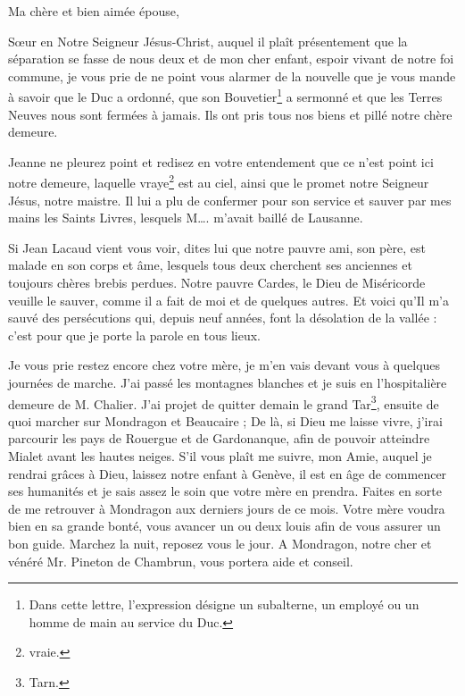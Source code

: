 {
\Junicode

\vspace{-5mm}

Ma chère et bien aimée épouse,

Sœur en Notre Seigneur Jésus-Christ, auquel il plaît présentement que la séparation se fasse de nous deux et de mon cher enfant, espoir vivant de notre foi commune, je vous prie de ne point vous alarmer de la nouvelle que je vous mande à savoir que le Duc a ordonné, que son Bouvetier\footnote{Dans cette lettre, l'expression désigne un subalterne, un employé ou un homme de main au service du Duc.} a sermonné et que les Terres Neuves nous sont fermées à jamais. Ils ont pris tous nos biens et pillé notre chère demeure.

Jeanne ne pleurez point et redisez en votre entendement que ce n’est point ici notre demeure, laquelle vraye\footnote{vraie.} est au ciel, ainsi que le promet notre Seigneur Jésus, notre maistre. Il lui a plu de confermer pour son service et sauver par mes mains les Saints Livres, lesquels M…. m’avait baillé de Lausanne.

Si Jean Lacaud vient vous voir, dites lui que notre pauvre ami, son père, est malade en son corps et âme, lesquels tous deux cherchent ses anciennes et toujours chères brebis perdues. Notre pauvre Cardes, le Dieu de Miséricorde veuille le sauver, comme il a fait de moi et de quelques autres. Et voici qu’Il m’a sauvé des persécutions qui, depuis neuf années, font la désolation de la vallée : c’est pour que je porte la parole en tous lieux.

Je vous prie restez encore chez votre mère, je m’en vais devant vous à quelques journées de marche. J’ai passé les montagnes blanches et je suis en l’hospitalière demeure de M. Chalier. J’ai projet de quitter demain le grand Tar\footnote{Tarn.}, ensuite de quoi marcher sur Mondragon et Beaucaire ; De là, si Dieu me laisse vivre, j’irai parcourir les pays de Rouergue et de Gardonanque, afin de pouvoir atteindre Mialet avant les hautes neiges. S’il vous plaît me suivre, mon Amie, auquel je rendrai grâces à Dieu, laissez notre enfant à Genève, il est en âge de commencer ses humanités et je sais assez le soin que votre mère en prendra. Faites en sorte de me retrouver à Mondragon aux derniers jours de ce mois. Votre mère voudra bien en sa grande bonté, vous avancer un ou deux louis afin de vous assurer un bon guide. Marchez la nuit, reposez vous le jour. A Mondragon, notre cher et vénéré Mr. Pineton de Chambrun, vous portera aide et conseil.

}
